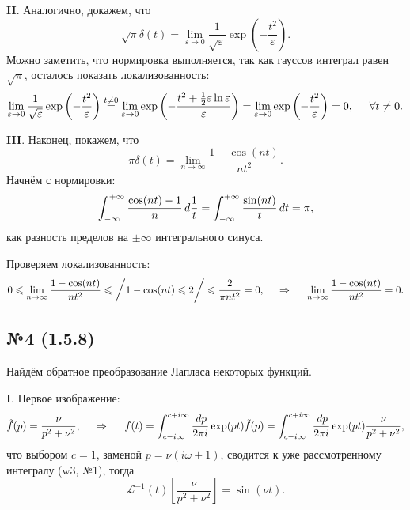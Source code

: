 \textbf{II}.  Аналогично, докажем, что
\begin{equation*}
    \sqrt{\pi} \delta(t) = \lim_{\varepsilon \to 0} \frac{1}{\sqrt{\varepsilon}} \exp\left(- \frac{t^2}{\varepsilon}\right).
\end{equation*}
Можно заметить, что нормировка выполняется, так как гауссов интеграл равен $\sqrt{\pi}$, осталось показать локализованность:
\begin{equation*}
    \lim_{\varepsilon \to 0} \frac{1}{\sqrt{\varepsilon}} \exp\left(- \frac{t^2}{\varepsilon}\right) \overset{t \neq 0}{=} \lim_{\varepsilon \to 0} \exp\left(
        - \frac{t^2 + \tfrac{1}{2} \varepsilon \ln \varepsilon}{\varepsilon}
    \right) = \lim_{\varepsilon \to 0}
    \exp\left(
        - \frac{t^2}{\varepsilon}
    \right)
    = 0, 
    \hspace{5 mm}  \forall t \neq 0.
\end{equation*}


\textbf{III}. Наконец, покажем, что
\begin{equation*}
    \pi \delta(t) = \lim_{n \to \infty} \frac{1 - \cos (nt)}{n t^2}.
\end{equation*}
Начнём с нормировки:
\begin{equation*}
    \int_{-\infty}^{+\infty} \frac{\cos (nt)-1}{n} \d \frac{1}{t}= 
    \int_{-\infty}^{+\infty} \frac{\sin (n t)}{t} \d t= \pi,
\end{equation*}
как разность пределов на $\pm \infty$ интегрального синуса. 

Проверяем локализованность:
\begin{equation*}
    0 \leq \lim_{n \to \infty} \frac{1 - \cos (nt)}{n t^2} \leq \bigg/ 1 - \cos(nt) \leq 2 \bigg/ \leq
    \frac{2}{\pi n t^2} = 0,
    \hspace{0.5cm} \Rightarrow \hspace{0.5cm}
    \lim_{n \to \infty} \frac{1 - \cos (nt)}{n t^2} =0.
\end{equation*}






\subsection*{№4 (1.5.8)}

Найдём обратное преобразование Лапласа некоторых функций.

\textbf{I}. Первое изображение:
\begin{equation*}
    \tilde{f}(p) = \frac{\nu}{p^2 + \nu^2},
    \hspace{0.5cm} \Rightarrow \hspace{0.5cm}
    f(t) = \int_{c-i \infty}^{c+i \infty} \frac{\d p}{2 \pi i} \exp(pt) \tilde{f}(p) = 
    \int_{c-i \infty}^{c+i \infty} \frac{\d p}{2 \pi i} \exp(pt) \frac{\nu}{p^2 + \nu^2},
\end{equation*}
что выбором $c = 1$, заменой $p = \nu (i \omega + 1)$, сводится к уже рассмотренному интегралу (w3, №1), тогда
\begin{equation*}
    \mathcal L^{-1}(t) \left[
        \frac{\nu}{p^2 + \nu^2}
    \right] = \sin(\nu t).
\end{equation*}


